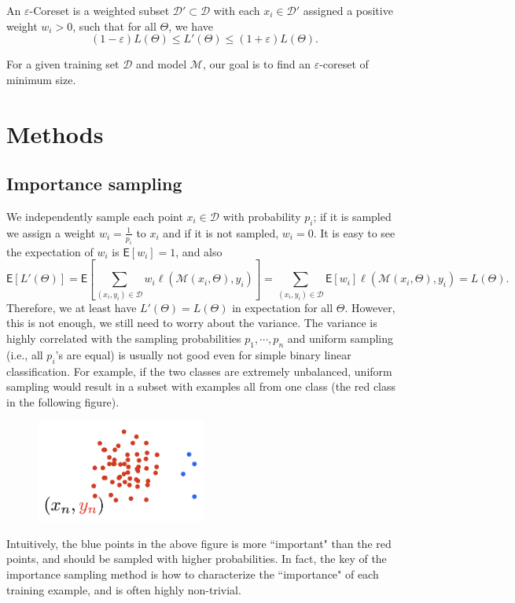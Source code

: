 \documentclass[12pt]{article}
\newcommand{\E}{\mathsf{E}}
\newcommand{\eps}{\varepsilon}
\newcommand{\D}      {\mathcal{D}}
\newcommand{\M}      {\mathcal{M}}
\begin{document}
An $\eps$-Coreset is a weighted subset $\D' \subset \D$ with each $x_i\in \D'$ assigned a positive weight $w_i > 0$, such that for all $\Theta$, we have 
\[
(1-\eps) L (\Theta) \le  L'(\Theta) \le (1+\eps)  L (\Theta).
\]

For a given training set $\D$ and model $\M$, our goal is to find an $\eps$-coreset of minimum size. 

\section{Methods}
\subsection{Importance sampling}
We independently sample each point $x_i \in \D $ with probability $p_i$; if it is sampled we assign a weight $w_i = \frac{1}{p_i}$ to $x_i$ and if it is not sampled, $w_i = 0$. It is easy to see the expectation of $w_i$ is $\E[w_i] = 1$, and also
$$\E[L'(\Theta)] = \E[ \sum_{(x_i,y_i) \in \D} w_i\ell(\M(x_i, \Theta), y_i)] =  \sum_{(x_i,y_i) \in \D} \E[w_i]\ell(\M(x_i, \Theta), y_i) = L(\Theta).$$
Therefore, we at least have $L'(\Theta) = L(\Theta)$ in expectation for all $\Theta$. However, this is not enough, we still need to worry about the variance. The variance is highly correlated with the sampling probabilities $p_1,\cdots, p_n$ and uniform sampling (i.e., all $p_i$'s are equal) is usually not good even for simple binary linear classification. For example, if the two classes are extremely unbalanced, uniform sampling would result in a subset with examples all from one class (the red class in the following figure).
\begin{figure}[h]
	\centering
	\includegraphics[width=0.5\textwidth]{binary}
\end{figure}

Intuitively, the blue points in the above figure is more ``important" than the red points, and should be sampled with higher probabilities. In fact, the key of the importance sampling method is how to characterize the ``importance" of each training example, and is often highly non-trivial.
\end{document}

